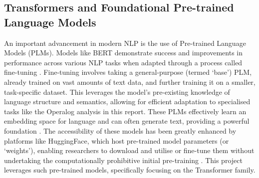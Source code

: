 \documentclass[10pt,oneside]{report}
\renewcommand{\citet}[1]{\citeauthor{#1}, \citeyear{#1}}
\begin{document}
%

\subsection{Transformers and Foundational Pre-trained Language Models}\label{sec:BERT} %

An important advancement in modern NLP is the use of Pre-trained Language Models (PLMs). Models like BERT \cite{devlin2019bert} demonstrate success and improvements in performance across various NLP tasks when adapted through a process called fine-tuning \cite{edunov2019pre, min2023recent}. Fine-tuning involves taking a general-purpose (termed `base') PLM, already trained on vast amounts of text data, and further training it on a smaller, task-specific dataset. This leverages the model's pre-existing knowledge of language structure and semantics, allowing for efficient adaptation to specialised tasks like the Operalog analysis in this report. These PLMs effectively learn an embedding space for language and can often generate text, providing a powerful foundation \cite{devlin2019bert}. The accessibility of these models has been greatly enhanced by platforms like HuggingFace, which host pre-trained model parameters (or `weights'), enabling researchers to download and utilise or fine-tune them without undertaking the computationally prohibitive initial pre-training \cite{wolf2019huggingface}. This project leverages such pre-trained models, specifically focusing on the Transformer family.
\end{document}
